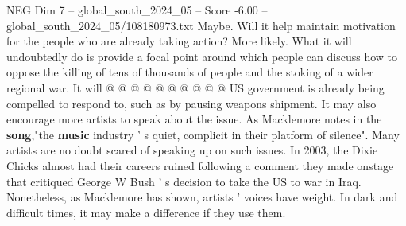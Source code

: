 \begin{textsample}{NEG Dim 7 – global\_south\_2024\_05 – Score -6.00 – global\_south\_2024\_05/108180973.txt}
Maybe.
Will it help maintain motivation for the people who are already taking action?
More likely.
What it will undoubtedly do is provide a focal point around which people can discuss how to oppose the killing of tens of thousands of people and the stoking of a wider regional war.
It will @ @ @ @ @ @ @ @ @ @ US government is already being compelled to respond to, such as by pausing weapons shipment.
It may also encourage more artists to speak about the issue.
As Macklemore notes in the \textbf{song},"the \textbf{music} industry ' s quiet, complicit in their platform of silence".
Many artists are no doubt scared of speaking up on such issues.
In 2003, the Dixie Chicks almost had their careers ruined following a comment they made onstage that critiqued George W Bush ' s decision to take the US to war in Iraq.
Nonetheless, as Macklemore has shown, artists ' voices have weight.
In dark and difficult times, it may make a difference if they use them.

\end{textsample}
